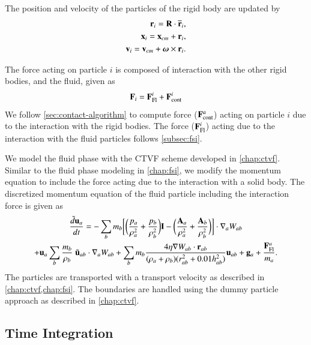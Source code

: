 The position and velocity of the particles of the rigid body are updated by
\begin{eqnarray}
  \label{eq:rfc:rb_particle_pos_update}
  \mathbf{r}_i = \mathbf{R} \cdot \overline{\mathbf{r}}_{i},\\
  \mathbf{x}_i = \mathbf{x}_{cm} + \mathbf{r}_{i},\\
  \mathbf{v}_i = \mathbf{v}_{cm} + \boldsymbol{\omega} \times \mathbf{r}_{i}.
\end{eqnarray}

The force acting on particle $i$ is composed of interaction with the other rigid
bodies, and the fluid, given as
\begin{eqnarray}
  \label{eq:rfc:rb_particle_pos_update}
  \mathbf{F}_i = \mathbf{F}_{\text{Fl}}^i + \mathbf{F}_{\text{cont}}^i
\end{eqnarray}
We follow \cref{sec:contact-algorithm} to compute force
($\mathbf{F}_{\text{cont}}^a$) acting on particle $i$ due to the interaction with
the rigid bodies. The force ($\mathbf{F}_{\text{Fl}}^i$) acting due to the
interaction with the fluid particles follows \cref{subsec:fsi}.

We model the fluid phase with the CTVF \parencite{adepu2021corrected} scheme
developed in \cref{chap:ctvf}. Similar to the fluid phase modeling in
\cref{chap:fsi}, we modify the momentum equation to include the force acting due
to the interaction with a solid body. The discretized momentum equation of the
fluid particle including the interaction force is given as
\begin{multline}
  \label{eq:rfc:sph-momentum-fluid}
  \frac{\tilde{d}\mathbf{u}_{a}}{dt} = - \sum_{b} m_b \bigg[
  \bigg(\frac{p_a}{\rho_a^2} + \frac{p_b}{\rho_b^2}\bigg) \mathbf{I} -
  \bigg(\frac{\mathbf{A}_a}{\rho_a^2} + \frac{\mathbf{A}_b}{\rho_b^2}
  \bigg) \bigg]
  \cdot \nabla_{a} W_{ab} \\
  + \mathbf{u}_{a} \sum_{b} \frac{m_b}{\rho_{b}} \; \tilde{\mathbf{u}}_{ab} \cdot
  \nabla_{a} W_{ab} + \sum_{b} m_b \frac{4 \eta \nabla W_{ab}\cdot
    \mathbf{r}_{ab}}{(\rho_a + \rho_b) (r_{ab}^2 + 0.01 h_{ab}^2)} \mathbf{u}_{ab} +
  \mathbf{g}_{a} + \frac{\mathbf{F}^a_{\text{Fl}}}{m_a}.
\end{multline}
The particles are transported with a transport velocity as described in
\cref{chap:ctvf,chap:fsi}. The boundaries are handled using the dummy particle
approach as described in \cref{chap:ctvf}.

\subsection{Time Integration}

